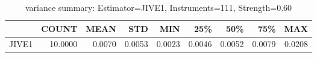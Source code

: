 \begin{table}[ht]
\centering
\caption{variance summary: Estimator=JIVE1, Instruments=111, Strength=0.60}
\begin{tabular}{lrrrrrrrr}
\toprule
 & COUNT & MEAN & STD & MIN & 25\% & 50\% & 75\% & MAX \\
\midrule
JIVE1 & 10.0000 & 0.0070 & 0.0053 & 0.0023 & 0.0046 & 0.0052 & 0.0079 & 0.0208 \\
\bottomrule
\end{tabular}
\end{table}
